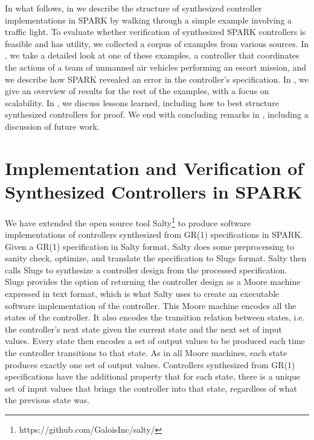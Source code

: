 \documentclass[runningheads]{llncs}
\begin{document}
In what follows, in  we describe the structure of synthesized controller implementations in SPARK 
by walking through a simple example involving a traffic light. 
To evaluate whether verification of synthesized SPARK controllers is feasible and has utility, 
we collected a corpus of examples from various sources. 
In , we take a detailed look at one of these examples, a controller that coordinates the actions of 
a team of unmanned air vehicles performing an escort mission, 
and we describe how SPARK revealed an error in the controller's specification. 
In , we give an overview of results for the rest of the examples, with a focus on scalability. 
In , we discuss lessons learned, including how to best structure synthesized controllers for proof.  
We end with concluding remarks in , including a discussion of future work.

\section{Implementation and Verification of Synthesized Controllers in SPARK}
\label{sec:implementation}

We have extended the open source tool Salty\footnote{https://github.com/GaloisInc/salty/} to produce software implementations of controllers synthesized from GR(1) specifications in SPARK. 
Given a GR(1) specification in Salty format, Salty does some preprocessing to sanity check, optimize, and translate the specification to Slugs format. 
Salty then calls Slugs to synthesize a controller design from the processed specification. 
Slugs provides the option of returning the controller design as a Moore machine expressed in text format, 
which is what Salty uses to create an executable software implementation of the controller. 
This Moore machine encodes all the states of the controller. %
It also encodes the transition relation between states, i.e. the controller's next state given the current state 
and the next set of input values. 
Every state then encodes a set of output values to be produced each time the controller transitions to that state. 
As in all Moore machines, each state produces exactly one set of output values. 
Controllers synthesized from GR(1) specifications have the additional property that for each state, 
there is a unique set of input values that brings the controller into that state, regardless of what the previous state was.
\end{document}

